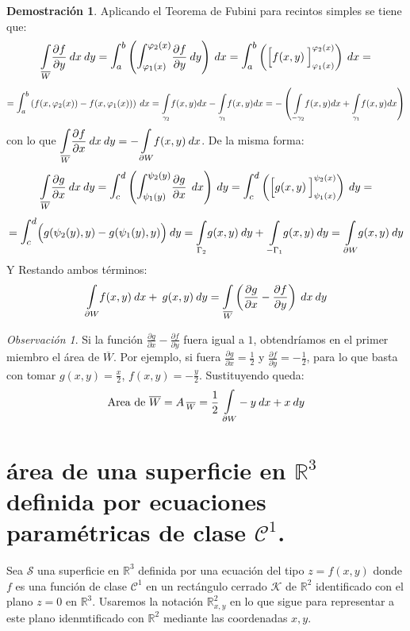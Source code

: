\documentclass[12pt,twoside]{report}
\newcommand\mc[1]{\mathcal{#1}}
\newcommand{\bbint}{\mathlarger{\mathlarger{\int}}}
\theoremstyle{azul}
\theoremstyle{azul2}
\theoremstyle{plain}
\theoremstyle{definition}
\newtheorem*{dem}{Demostración}
\theoremstyle{remark}
\newtheorem*{obs}{Observación}
\begin{document}
\begin{dem}
Aplicando el Teorema de Fubini para recintos simples se tiene que: 
$$\displaystyle \underset{{\overline{W}}}{\mathlarger{\int}} \frac{\partial f}{\partial y}\: dx \: dy = \bbint_a^b \left( \bbint_{\varphi_1(x)}^{\varphi_2(x)} \frac{\partial f}{\partial y} \: dy \right) \: dx = \bbint_a^b \left( \Big[ f(x,y) \:  \Big]_{\varphi_1(x)}^{\varphi_2(x)} \right)\: dx = $$ $$ = \bbint_a^b \left( f(x,\varphi_2(x)) - f(x,\varphi_1(x)) \right) \: dx = \underset{\gamma_2}{\int} f(x,y) dx - \underset{\gamma_1}{\int} f(x,y) dx = - \left( \underset{-\gamma_2}{\int} f(x,y) dx + \underset{\gamma_1}{\int} f(x,y) dx \right) $$ con lo que $\displaystyle \underset{{\overline{W}}}{\mathlarger{\int}} \frac{\partial f}{\partial x}\: dx \: dy = - \underset{{\partial{W}}}{\mathlarger{\int}} f(x,y)\: dx$. De la misma forma:
$$\underset{{\overline{W}}}{\mathlarger{\int}} \frac{\partial g}{\partial x}\: dx \: dy = \bbint_c^d \left( \bbint_{\psi_1(y)}^{\psi_2(y)} \frac{\partial g}{\partial x} \: \: dx \right) \: dy = \bbint_c^d \left( \Big[ g(x,y) \: \Big]_{\psi_1(x)}^{\psi_2(x)} \right) \: dy =$$ $$=\bbint_c^d \Big( g(\psi_2(y),y) - g(\psi_1(y),y) \Big) \: dy = \underset{\Gamma_2}{\int} g(x,y) \: dy + \underset{-\Gamma_1}{\int} g(x,y) \: dy = \underset{\partial W}{\int} g(x,y) \: dy$$
Y Restando ambos términos:
$$\underset{{\partial W}}{\mathlarger{\int}} f(x,y) \: dx + \: g(x,y) \: dy = \underset{{\overline{W}}}{\mathlarger{\int}} \left( \dfrac{\partial g}{\partial x} - \dfrac{\partial f}{\partial y}\right) \: dx \: dy$$
\end{dem}

\begin{obs}
Si la función $\frac{\partial g}{\partial x} - \frac{\partial f}{\partial y}$ fuera igual a $1$, obtendríamos en el primer miembro el área de $\overline{W}$. Por ejemplo, si fuera $\frac{\partial g}{\partial x} = \frac{1}{2}$ y $\frac{\partial f}{\partial y} = -\frac{1}{2}$, para lo que basta con tomar $g(x,y) = \frac{x}{2}$, $f(x,y) = -\frac{y}{2}$. Sustituyendo queda: $$\text{Area de } \overline{W} = A_{\: \overline{W}} = \frac{1}{2} \; \underset{\partial W}{\bbint} -y\: dx + x \: dy$$
\end{obs}

\section{área de una superficie en $\mathbb{R}^3$ definida por ecuaciones paramétricas de clase $\mathcal{C}^1$.}
Sea $\mc{S}$ una superficie en $\mathbb{R}^3$ definida por una ecuación del tipo $z=f(x,y)$ donde $f$ es una función de clase $\mc{C}^1$ en un rectángulo cerrado $\mc{K}$ de $\mathbb{R}^2$ identificado con el plano $z = 0$ en $\mathbb{R}^3$. Usaremos la notación $\mathbb{R}_{x,y}^2$ en lo que sigue para representar a este plano idenmtificado con $\mathbb{R}^2$ mediante las coordenadas $x,y$. 
\end{document}
